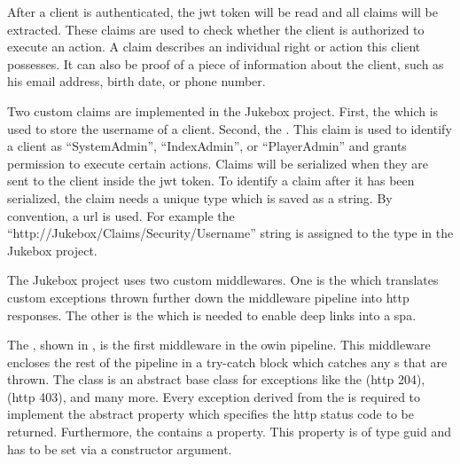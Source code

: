 \newpage



After a client is authenticated, the \gls{jwt} token will be read and all claims will be extracted. These claims are used to check whether the client is authorized to execute an action. A claim describes an individual right or action this client possesses. It can also be proof of a piece of information about the client, such as his email address, birth date, or phone number. \cite{claimsBasedAuth}

Two custom claims are implemented in the Jukebox project. First, the  which is used to store the username of a client. Second, the . This claim is used to identify a client as \enquote{SystemAdmin}, \enquote{IndexAdmin}, or \enquote{PlayerAdmin} and grants permission to execute certain actions. Claims will be serialized when they are sent to the client inside the \gls{jwt} token. To identify a claim after it has been serialized, the claim needs a unique type which is saved as a string. By convention, a \gls{url} is used. For example the \enquote{http://Jukebox/Claims/Security/Username} string is assigned to the  type in the Jukebox project.


The Jukebox project uses two custom middlewares. One is the  which translates custom exceptions thrown further down the middleware pipeline into \gls{http} responses. The other is the  which is needed to enable deep links into a \gls{spa}.


The , shown in , is the first middleware in the \gls{owin} pipeline. This middleware encloses the rest of the pipeline in a try-catch block which catches any s that are thrown. The  class is an abstract base class for exceptions like the  (\gls{http} 204),  (\gls{http} 403), and many more. Every exception derived from the  is required to implement the abstract  property which specifies the \gls{http} status code to be returned. Furthermore, the  contains a  property. This property is of type \gls{guid} and has to be set via a constructor argument.

